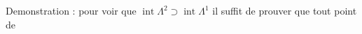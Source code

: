 Demonstration : pour voir que $\operatorname{int}\Lambda^2\supset\operatorname{int}\Lambda^1$ il suffit de prouver que tout point de
